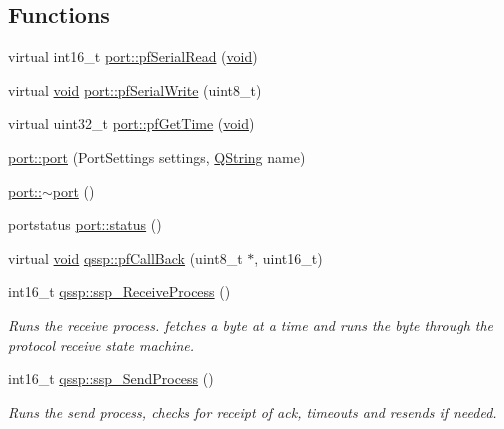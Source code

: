 \subsection*{\-Functions}
\begin{DoxyCompactItemize}
\item 
virtual int16\-\_\-t \hyperlink{group___uploader_gae97ecc8aa7bff549fc95c2fe0c922279}{port\-::pf\-Serial\-Read} (\hyperlink{group___u_a_v_objects_plugin_ga444cf2ff3f0ecbe028adce838d373f5c}{void})
\item 
virtual \hyperlink{group___u_a_v_objects_plugin_ga444cf2ff3f0ecbe028adce838d373f5c}{void} \hyperlink{group___uploader_ga30e501e90b5d17c51d6f26ff169cf03d}{port\-::pf\-Serial\-Write} (uint8\-\_\-t)
\item 
virtual uint32\-\_\-t \hyperlink{group___uploader_ga175fa612d12b3411709d60fef9c26cc2}{port\-::pf\-Get\-Time} (\hyperlink{group___u_a_v_objects_plugin_ga444cf2ff3f0ecbe028adce838d373f5c}{void})
\item 
\hyperlink{group___uploader_ga07c31ea30e7226e74f05a64bf51e89c8}{port\-::port} (\-Port\-Settings settings, \hyperlink{group___u_a_v_objects_plugin_gab9d252f49c333c94a72f97ce3105a32d}{\-Q\-String} name)
\item 
\hyperlink{group___uploader_gacd903c84068e3b7829d0688ae4aad58e}{port\-::$\sim$port} ()
\item 
portstatus \hyperlink{group___uploader_ga047435f44b40228c4e544c28bd77f03b}{port\-::status} ()
\item 
virtual \hyperlink{group___u_a_v_objects_plugin_ga444cf2ff3f0ecbe028adce838d373f5c}{void} \hyperlink{group___uploader_ga78a7ba52d304ce0352e013e99e98820d}{qssp\-::pf\-Call\-Back} (uint8\-\_\-t $\ast$, uint16\-\_\-t)
\item 
int16\-\_\-t \hyperlink{group___uploader_ga11e7402dcc0d8efde83d13592279f122}{qssp\-::ssp\-\_\-\-Receive\-Process} ()
\begin{DoxyCompactList}\small\item\em \-Runs the receive process. fetches a byte at a time and runs the byte through the protocol receive state machine. \end{DoxyCompactList}\item 
int16\-\_\-t \hyperlink{group___uploader_gaa1b44e385ddf057c81585809dc71e4ba}{qssp\-::ssp\-\_\-\-Send\-Process} ()
\begin{DoxyCompactList}\small\item\em \-Runs the send process, checks for receipt of ack, timeouts and resends if needed. \end{DoxyCompactList}\item 

\end{DoxyCompactItemize}
